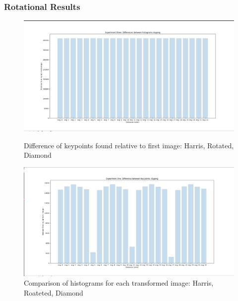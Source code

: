 \documentclass[conference]{IEEEtran}
\begin{document}
\subsubsection{Rotational Results}
\begin{figure}[!htb]
  \centering
  \begin{minipage}[t]{0.45\textwidth}
    \includegraphics[width=\textwidth]{../programme/results/Task_1/rotated_experiements/Harris/dugong/num_corners.png}
    \caption{Difference of keypoints found relative to first image: Harris, Rotated, Diamond}
    \label{Difference of keypoints found relative to first image: Harris, Rotated, Diamond}
  \end{minipage}
  \hfill
  \begin{minipage}[t]{0.45\textwidth}
    \includegraphics[width=\textwidth]{../programme/results/Task_1/rotated_experiements/Harris/dugong/diff_hists.png}
    \caption{Comparison of histograms for each transformed image: Harris, Roateted, Diamond}
    \label{Comparison of histograms for each transformed image: Harris, Rotated, Diamond}
  \end{minipage}
\end{figure}
\end{document}
